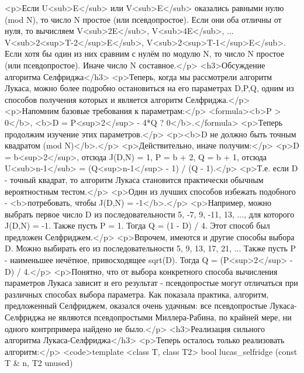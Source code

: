 <p>Если U<sub>E</sub> или V<sub>E</sub> оказались равными нулю (mod N), то число N простое (или псевдопростое). Если они оба отличны от нуля, то вычисляем V<sub>2E</sub>, V<sub>4E</sub>, ... V<sub>2<sup>T-2</sup>E</sub>, V<sub>2<sup>T-1</sup>E</sub>. Если хотя бы один из них сравним с нулём по модулю N, то число N простое (или псевдопростое). Иначе число N составное.</p>
<h3>Обсуждение алгоритма Селфриджа</h3>
<p>Теперь, когда мы рассмотрели алгоритм Лукаса, можно более подробно остановиться на его параметрах D,P,Q, одним из способов получения которых и является алгоритм Селфриджа.</p>
<p>Напомним базовые требования к параметрам:</p>
<formula><b>P > 0</b>,
<b>D = P<sup>2</sup> - 4*Q ? 0</b>.</formula>
<p>Теперь продолжим изучение этих параметров.</p>
<p><b>D не должно быть точным квадратом (mod N)</b>.</p>
<p>Действительно, иначе получим:</p>
<p>D = b<sup>2</sup>, отсюда J(D,N) = 1, P = b + 2, Q = b + 1, отсюда U<sub>n-1</sub> = (Q<sup>n-1</sup> - 1) / (Q - 1).</p>
<p>Т.е. если D - точный квадрат, то алгоритм Лукаса становится практически обычным вероятностным тестом.</p>
<p>Один из лучших способов избежать подобного - <b>потребовать, чтобы J(D,N) = -1</b>.</p>
<p>Например, можно выбрать первое число D из последовательности 5, -7, 9, -11, 13, ..., для которого J(D,N) = -1. Также пусть P = 1. Тогда Q = (1 - D) / 4. Этот способ был предложен Селфриджем.</p>
<p>Впрочем, имеются и другие способы выбора D. Можно выбирать его из последовательности 5, 9, 13, 17, 21, ... Также пусть P - наименьшее нечётное, привосходящее sqrt(D). Тогда Q = (P<sup>2</sup> - D) / 4.</p>
<p>Понятно, что от выбора конкретного способа вычисления параметров Лукаса зависит и его результат - псевдопростые могут отличаться при различных способах выбора параметра. Как показала практика, алгоритм, предложенный Селфриджем, оказался очень удачным: все псевдопростые Лукаса-Селфриджа не являются псевдопростыми Миллера-Рабина, по крайней мере, ни одного контрпримера найдено не было.</p>
<h3>Реализация сильного алгоритма Лукаса-Селфриджа</h3>
<p>Теперь осталось только реализовать алгоритм:</p>
<code>template <class T, class T2>
bool lucas_selfridge (const T & n, T2 unused)
